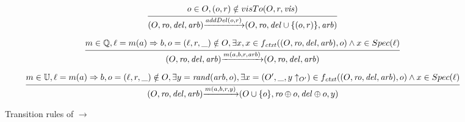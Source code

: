 \begin{figure}[ht]

\[
\begin{array}{l c}
\bigfrac{ o \in O, (o,r)\notin visTo(O,r,\mathit{vis}) }
{ (O,\mathit{ro},\mathit{del},\mathit{arb}) {\xrightarrow{addDel(o,r)}} (O,\mathit{ro},\mathit{del} \cup \{ (o,r) \},\mathit{arb}) } %
\end{array}
\]



\[
\begin{array}{l c}
\bigfrac{ m \in \mathbb{Q}, \ell = m(a) \Rightarrow b, o=(\ell,r,\_) \notin O, \exists x, x \in f_{\mathit{ctxt}}((O,\mathit{ro},\mathit{del},\mathit{arb}),o) \wedge x \in Spec(\ell) }
{ (O,\mathit{ro},\mathit{del},\mathit{arb}) {\xrightarrow{m(a,b,r,\mathit{arb})}} (O,\mathit{ro},\mathit{del},\mathit{arb}) } %
\end{array}
\]



\[
\begin{array}{l c}
\bigfrac{ m \in \mathbb{U}, \ell = m(a) \Rightarrow b, o = (\ell,r,\_) \notin O, \exists y=\mathit{rand}(\mathit{arb},o), \exists x = (O',\_,y \uparrow_{O'} ) \in f_{\mathit{ctxt}}((O,\mathit{ro},\mathit{del},\mathit{arb}),o) \wedge x \in Spec(\ell) }
{ (O,\mathit{ro},\mathit{del},\mathit{arb}) {\xrightarrow{m(a,b,r,y)}} (O \cup \{ o \},\mathit{ro} \oplus o ,\mathit{del} \oplus o,y) } %
\end{array}
\]

\caption{Transition rules of $\rightarrow$}
\label{fig:transition rules of RImpSpec}
\end{figure}

